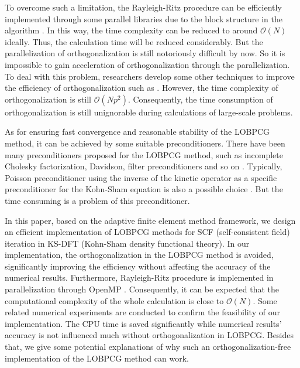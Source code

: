 \documentclass[12pt]{article}
\numberwithin{figure}{section}
\numberwithin{table}{section}
\begin{document}
To overcome such a limitation, the Rayleigh-Ritz procedure can be efficiently implemented through some parallel libraries due to the block structure in the algorithm \cite{bottin2008large,duersch2018robust}. In this way, the time complexity can be reduced to around $\mathcal{O}(N)$ ideally. Thus, the calculation time will be reduced considerably. But the parallelization of orthogonalization is still notoriously difficult by now. So it is impossible to gain acceleration of orthogonalization through the parallelization. To deal with this problem, researchers develop some other techniques to improve the efficiency of orthogonalization such as \cite{dziekonski2017gpu,kressner2023mixed}. However, the time complexity of orthogonalization is still $\mathcal{O}(Np^2)$. Consequently, the time consumption of orthogonalization is still unignorable during calculations of large-scale problems.

As for ensuring fast convergence and reasonable stability of the LOBPCG method, it can be achieved by some suitable preconditioners. There have been many preconditioners proposed for the LOBPCG method, such as incomplete Cholesky factorization, Davidson, filter preconditioners and so on \cite{knyazev2001toward,saad1996solution,arbenz2012lecture,seitsonen1995real,GAPP}. Typically, Poisson preconditioner using the inverse of the kinetic operator as a specific preconditioner for the Kohn-Sham equation is also a possible choice \cite{EarlyPoissonPre,Octopus}. But the time consuming is a problem of this preconditioner. 

In this paper, based on the adaptive finite element method framework, we design an efficient implementation of LOBPCG methods for SCF (self-consistent field) iteration in KS-DFT (Kohn-Sham density functional theory). In our implementation, the orthogonalization in the LOBPCG method is avoided, significantly improving the efficiency without affecting the accuracy of the numerical results. Furthermore, Rayleigh-Ritz procedure is implemented in parallelization through OpenMP \cite{dagum1998openmp}. Consequently, it can be expected that the computational complexity of the whole calculation is close to $\mathcal{O}(N)$. Some related numerical experiments are conducted to confirm the feasibility of our implementation. The CPU time is saved significantly while numerical results' accuracy is not influenced much without orthogonalization in LOBPCG. Besides that, we give some potential explanations of why such an orthogonalization-free implementation of the LOBPCG method can work. 
\end{document}

